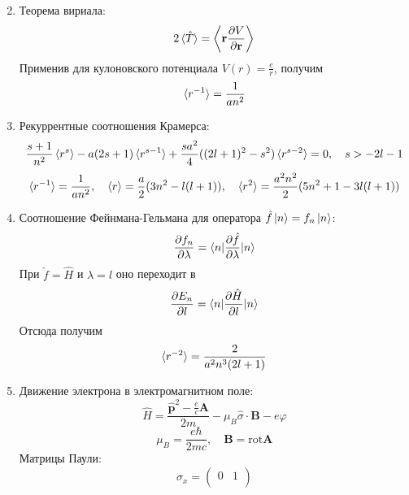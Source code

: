 \documentclass[12pt]{article}
\theoremstyle{definition}
\begin{document}
\begin{enumerate}
\begin{equation}
    \end{equation}
    \item Теорема вириала:
    \begin{equation}
        2\braket{\hat{T}}=\left<\textbf{r}\frac{\partial V}{\partial\textbf{r}}\right>
    \end{equation}
    Применив для кулоновского потенциала $V(r)=\frac{e}{r}$, получим
    \begin{equation}
        \braket{r^{-1}}=\frac{1}{an^2}
    \end{equation}
    \item Рекуррентные соотношения Крамерса:
    \begin{equation}
        \frac{s+1}{n^2}\braket{r^s}-a(2s+1)\braket{r^{s-1}}+\frac{sa^2}{4}((2l+1)^2-s^2)\braket{r^{s-2}}=0,\quad s>-2l-1
    \end{equation}
    \begin{equation}
        \braket{r^{-1}}=\frac{1}{an^2},\quad \braket{r}=\frac{a}{2}(3n^2-l(l+1)),\quad\braket{r^2}=\frac{a^2n^2}{2}(5n^2+1-3l(l+1))
    \end{equation}
    \item Соотношение Фейнмана-Гельмана для оператора $\hat{f}\ket{n}=f_n\ket{n}$:
    \begin{equation}
        \frac{\partial f_n}{\partial\lambda}=\braket{n|\frac{\partial\hat{f}}{\partial\lambda}|n}
    \end{equation}
    При $\hat{f}=\hat{H}$ и $\lambda=l$ оно переходит в
    \begin{equation}
        \frac{\partial E_n}{\partial l}=\braket{n|\frac{\partial\hat{H}}{\partial l}|n}
    \end{equation}
    Отсюда получим
    \begin{equation}
        \braket{r^{-2}}=\frac{2}{a^2n^3(2l+1)}
    \end{equation}
    \item Движение электрона в электромагнитном поле:
    \begin{equation}
        \hat{H}=\frac{\hat{\textbf{p}}^2-\frac{e}{c}\textbf{A}}{2m}-\mu_B\hat{\sigma}\cdot\textbf{B}-e\varphi
    \end{equation}
    \begin{equation}
        \mu_B=\frac{e\hbar}{2mc},\quad \textbf{B}=\text{rot}\textbf{A}
    \end{equation}
    Матрицы Паули:
    \begin{equation}
        \sigma_x=\begin{pmatrix}
        0 & 1\\

\end{pmatrix}
\end{equation}
\end{enumerate}
\end{document}
